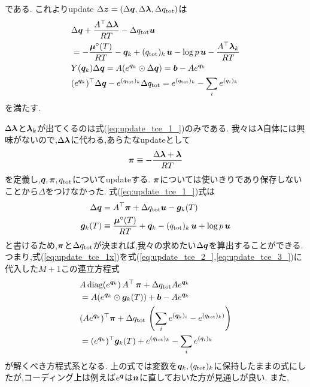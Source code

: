 である. これよりupdate $\Delta \boldsymbol{z} = (\Delta \boldsymbol{q}, \Delta \boldsymbol{\lambda}, \Delta q_\mathrm{tot})$は
\begin{align}
\label{eq:update_tce_1_}
    &\Delta \boldsymbol{q} + \frac{A^\top \Delta \boldsymbol{\lambda}}{RT} - \Delta q_\mathrm{tot} \boldsymbol{u} \nonumber \\
    &= -\frac{\boldsymbol{\mu}^\circ(T)}{RT} - {\boldsymbol{q}}_k + (q_\mathrm{tot})_k \, \boldsymbol{u} - \log{p} \, \boldsymbol{u}  - \frac{A^\top \boldsymbol{\lambda}_k}{RT} \\
\label{eq:update_tce_2_}
    &Y(\boldsymbol{q}_k) \Delta \boldsymbol{q} = A (e^{\boldsymbol{q}_k} \odot \Delta \boldsymbol{q}) = \boldsymbol{b} - A e^{\boldsymbol{q}_k} \\
\label{eq:update_tce_3_}
    &(e^{\boldsymbol{q}_k})^\top \Delta \boldsymbol{q}  - e^{(q_\mathrm{tot})_k} \Delta q_\mathrm{tot} = e^{(q_\mathrm{tot})_k} - \sum_i {e^{(q_i)_k}} 
\end{align}
を満たす. 

$\Delta \boldsymbol{\lambda}$と$\boldsymbol{\lambda}_k$が出てくるのは式(\ref{eq:update_tce_1_})のみである. 我々は$\boldsymbol{\lambda}$自体には興味がないので,$\Delta \boldsymbol{\lambda}$に代わる,あらたなupdateとして
\begin{align}
    \boldsymbol{\pi} \equiv - \frac{\Delta \boldsymbol{\lambda} + \boldsymbol{\lambda}}{RT} 
\end{align}
を定義し,$\boldsymbol{q}, \boldsymbol{\pi}, q_\mathrm{tot}$についてupdateする. $\boldsymbol{\pi}$については使いきりであり保存しないことから$\Delta$をつけなかった. 式(\ref{eq:update_tce_1_})式は
\begin{align}
\label{eq:update_tce_1x}
    \Delta \boldsymbol{q} &=  A^\top \boldsymbol{\pi} + \Delta q_\mathrm{tot} \boldsymbol{u} - \boldsymbol{g}_k(T) \\
    \boldsymbol{g}_k (T) &\equiv \frac{\boldsymbol{\mu}^\circ(T)}{RT} + {\boldsymbol{q}}_k - (q_\mathrm{tot})_k \, \boldsymbol{u} + \log{p} \, \boldsymbol{u} 
\end{align}
と書けるため,$\boldsymbol{\pi}$と$\Delta q_\mathrm{tot}$が決まれば,我々の求めたい$\Delta \boldsymbol{q}$を算出することができる. つまり,式(\ref{eq:update_tce_1x})を式(\ref{eq:update_tce_2_},\ref{eq:update_tce_3_})に代入した$M+1$この連立方程式
\begin{align}
    &A \, \mathrm{diag} (e^{\boldsymbol{q}_k}) \, A^\top \, \boldsymbol{\pi} + \Delta q_\mathrm{tot} A e^{\boldsymbol{q}_k} \nonumber \\
    &= A (e^{\boldsymbol{q}_k} \odot \boldsymbol{g}_k (T) ) + \boldsymbol{b} - A  e^{\boldsymbol{q}_k} \\
    &(A  e^{\boldsymbol{q}_k})^\top \boldsymbol{\pi} + \Delta q_\mathrm{tot} \, \left( \sum_i e^{(\boldsymbol{q}_k)_i} - e^{(q_\mathrm{tot})_k)} \right) \nonumber \\ 
    &= (e^{\boldsymbol{q}_k})^\top \boldsymbol{g}_k(T) + e^{(q_\mathrm{tot})_k} - \sum_i {e^{(q_i)_k}} 
\end{align}
が解くべき方程式系となる. 上の式では変数を$\boldsymbol{q}_k, (q_\mathrm{tot})_k$に保持したままの式にしたが,コーディング上は例えば$e^{\boldsymbol{q}}$は$\boldsymbol{n}$に直しておいた方が見通しが良い. また,
